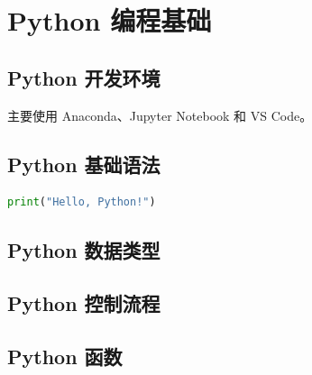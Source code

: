 
\chapter{Python 编程基础}

\section{Python 开发环境}

主要使用 Anaconda、Jupyter Notebook 和 VS Code。

\section{Python 基础语法}

\begin{lstlisting}[language=Python]
print("Hello, Python!")
\end{lstlisting}

\section{Python 数据类型}

\section{Python 控制流程}

\section{Python 函数}
